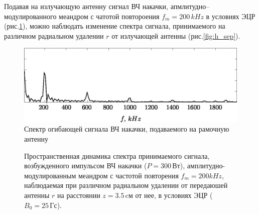 \documentclass[autoref,10pt]{disser}
\begin{document}
Подавая на излучающую антенну сигнал ВЧ накачки, апмлитудно--мо\-ду\-ли\-ро\-ван\-ного меандром с чатотой повтороения $f_m=200\,kHz$ в условиях ЭЦР (\mbox{рис.\ref{fig:h_sep_base}}), можно наблюдать изменение спектра сигнала, принимаемого на различном радиальном удалении $r$ от излучающей антенны (\mbox{рис.\ref{fig:h_sep}}).
\begin{figure}[H]
    \centering
    \includegraphics*[width=0.8\columnwidth]{pics/h_separation_base}
    \caption{Спектр огибающей сигнала ВЧ накачки, подаваемого на рамочную антенну}
    \label{fig:h_sep_base}
 \end{figure}

%   
\begin{figure}
   \centering
   \def\svgwidth{0.7\columnwidth} %
   
   \vspace{1.0cm}
   \caption{Пространственная динамика спектра принимаемого сигнала, возбужденного импульсом ВЧ накачки ($P=300$\,Вт),  амплитудно-мо\-ду\-ли\-ро\-ван\-ным меандром с частотой повторения $f_m=200 kHz$, наблюдаемая при различном радиальном удалении от передаюшей антенны $r$ на расстоянии $z=3.5$\,cм от нее, в условиях ЭЦР ($B_0 = 25$\,Гс).}
\end{figure}
\end{document}
